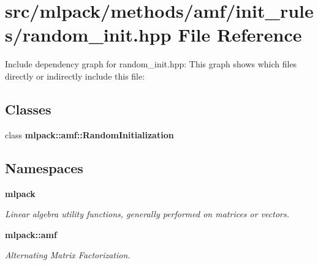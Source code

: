 \section{src/mlpack/methods/amf/init\-\_\-rules/random\-\_\-init.hpp File Reference}
\label{amf_2init__rules_2random__init_8hpp}
Include dependency graph for random\-\_\-init.\-hpp\-:
This graph shows which files directly or indirectly include this file\-:
\subsection*{Classes}
\begin{DoxyCompactItemize}
\item 
class {\bf mlpack\-::amf\-::\-Random\-Initialization}
\end{DoxyCompactItemize}
\subsection*{Namespaces}
\begin{DoxyCompactItemize}
\item 
{\bf mlpack}
\begin{DoxyCompactList}\small\item\em Linear algebra utility functions, generally performed on matrices or vectors. \end{DoxyCompactList}\item 
{\bf mlpack\-::amf}
\begin{DoxyCompactList}\small\item\em Alternating Matrix Factorization. \end{DoxyCompactList}\end{DoxyCompactItemize}
